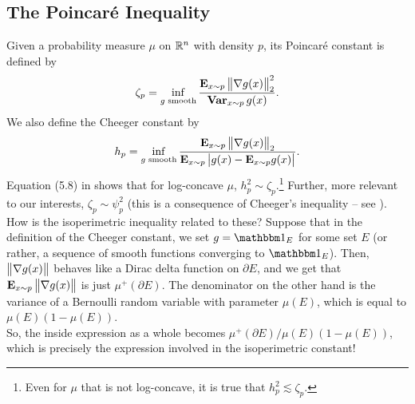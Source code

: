 \documentclass{article}
\begin{document}

	\subsection{The Poincar\'{e} Inequality}

		Given a probability measure $\mu$ on $\mathbb{R}^n$ with density $p$, its Poincar\'{e} constant is defined by
		\[ \zeta_p = \inf_{g\text{ smooth}} \frac{\textbf{E}_{x \sim p} \left\lVert\nabla g(x)\right\rVert_2^2}{\operatorname{\textbf{Var}}_{x \sim p} g(x)}. \]
		We also define the Cheeger constant by
		\[ h_p = \inf_{g\text{ smooth}} \frac{\textbf{E}_{x \sim p} \left\lVert\nabla g(x)\right\rVert_2}{\textbf{E}_{x \sim p} \left| g(x) - \textbf{E}_{x \sim p} g(x) \right|}. \]
		Equation (5.8) in \cite{LedouxCheegerPoincareConstant} shows that for log-concave $\mu$, $h_p^2 \sim \zeta_p$.\footnote{Even for $\mu$ that is not log-concave, it is true that $h_p^2 \lesssim \zeta_p$.} Further, more relevant to our interests, $\zeta_p \sim \psi_p^2$ (this is a consequence of Cheeger's inequality -- see \cite{CheegerInequality,Maz60}).\\
		How is the isoperimetric inequality related to these? Suppose that in the definition of the Cheeger constant, we set $g = \indic_E$ for some set $E$ (or rather, a sequence of smooth functions converging to $\indic_E$). Then, $\left\lVert\nabla g(x)\right\rVert$ behaves like a Dirac delta function on $\partial E$, and we get that $\textbf{E}_{x \sim p} \left\lVert\nabla g(x)\right\rVert$ is just $\mu^+(\partial E)$. The denominator on the other hand is the variance of a Bernoulli random variable with parameter $\mu(E)$, which is equal to $\mu(E)(1 - \mu(E))$.\\
		So, the inside expression as a whole becomes $\mu^+(\partial E) / \mu(E) ( 1 - \mu(E) )$, which is precisely the expression involved in the isoperimetric constant!
\end{document}
